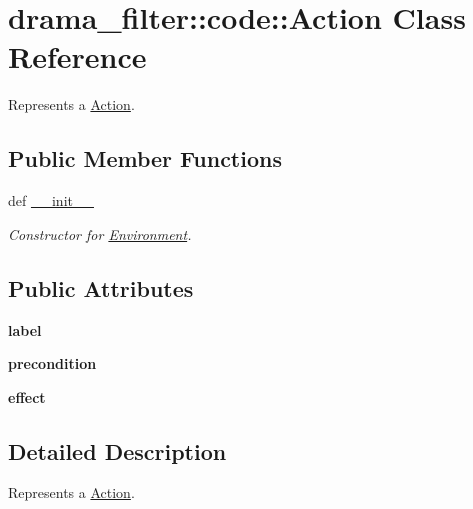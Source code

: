 \hypertarget{classdrama__filter_1_1code_1_1Action}{
\section{drama\_\-filter::code::Action Class Reference}
\label{classdrama__filter_1_1code_1_1Action}
}


Represents a \hyperlink{classdrama__filter_1_1code_1_1Action}{Action}.  


\subsection*{Public Member Functions}
\begin{DoxyCompactItemize}
\item 
def \hyperlink{classdrama__filter_1_1code_1_1Action_a039d5a6f0650e306951ebe3339b89e06}{\_\-\_\-init\_\-\_\-}
\begin{DoxyCompactList}\small\item\em Constructor for \hyperlink{classdrama__filter_1_1code_1_1Environment}{Environment}. \end{DoxyCompactList}\end{DoxyCompactItemize}
\subsection*{Public Attributes}
\begin{DoxyCompactItemize}
\item 
\hypertarget{classdrama__filter_1_1code_1_1Action_aa57805e22b829375741ef3625f3368c2}{
{\bfseries label}}
\label{classdrama__filter_1_1code_1_1Action_aa57805e22b829375741ef3625f3368c2}

\item 
\hypertarget{classdrama__filter_1_1code_1_1Action_a4d060d1e295f30ea5a2b228a408770ad}{
{\bfseries precondition}}
\label{classdrama__filter_1_1code_1_1Action_a4d060d1e295f30ea5a2b228a408770ad}

\item 
\hypertarget{classdrama__filter_1_1code_1_1Action_a979a87a98ad9411df4653c4cff0e8fbc}{
{\bfseries effect}}
\label{classdrama__filter_1_1code_1_1Action_a979a87a98ad9411df4653c4cff0e8fbc}

\end{DoxyCompactItemize}


\subsection{Detailed Description}
Represents a \hyperlink{classdrama__filter_1_1code_1_1Action}{Action}. 

